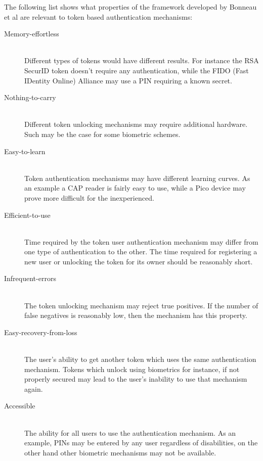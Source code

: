 The following list shows what properties of the framework developed by Bonneau et al are relevant to token based authentication mechanisms:
\begin{description}
  \item[Memory-effortless] \hfill \\
  Different types of tokens would have different results. For instance the RSA SecurID \cite{} token doesn't require any authentication, while the FIDO (Fast IDentity Online) Alliance \cite{} may use a PIN requiring a known secret.
  
  \item[Nothing-to-carry] \hfill \\
  Different token unlocking mechanisms may require additional hardware. Such may be the case for some biometric schemes.
  
  \item[Easy-to-learn] \hfill \\
  Token authentication mechanisms may have different learning curves. As an example a CAP reader is fairly easy to use, while a Pico device may prove more difficult for the inexperienced.
  
  \item[Efficient-to-use] \hfill \\
  Time required by the token user authentication mechanism may differ from one type of authentication to the other. The time required for registering a new user or unlocking the token for its owner should be reasonably short.
  
  \item[Infrequent-errors] \hfill \\
  The token unlocking mechanism may reject true positives. If the number of false negatives is reasonably low, then the mechanism has this property.
  
  \item[Easy-recovery-from-loss] \hfill \\
  The user's ability to get another token which uses the same authentication mechanism. Tokens which unlock using biometrics for instance, if not properly secured may lead to the user's inability to use that mechanism again.
  
  \item[Accessible] \hfill \\
  The ability for all users to use the authentication mechanism. As an example, PINs may be entered by any user regardless of disabilities, on the other hand other biometric mechanisms may not be available.
  

\end{description}
